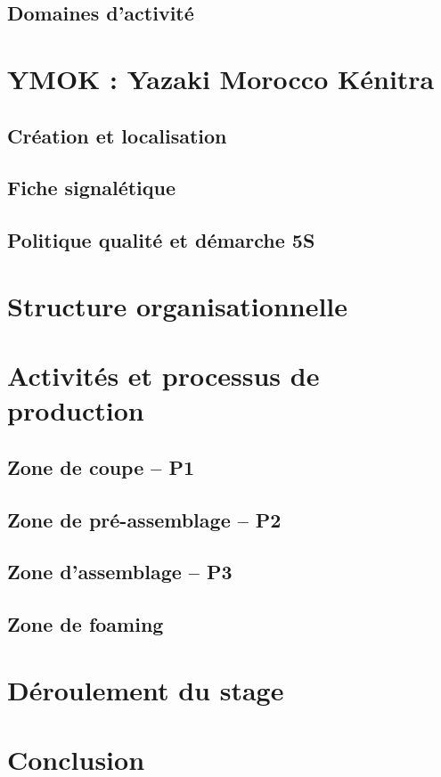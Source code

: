 \documentclass[12pt,a4paper]{report}
\begin{document}
\subsection{Domaines d'activité}
\section{YMOK : Yazaki Morocco Kénitra}
\subsection{Création et localisation}
\subsection{Fiche signalétique}
\subsection{Politique qualité et démarche 5S}
\section{Structure organisationnelle}
\section{Activités et processus de production}
\subsection{Zone de coupe -- P1}
\subsection{Zone de pré-assemblage -- P2}
\subsection{Zone d'assemblage -- P3}
\subsection{Zone de foaming}
\section{Déroulement du stage}
\section*{Conclusion}
\end{document}
